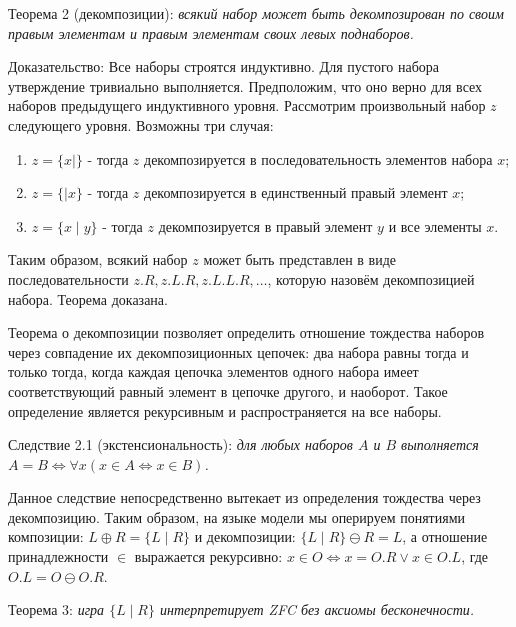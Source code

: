\documentclass[12pt]{article}
\begin{document}
Теорема 2 (декомпозиции): {\sl всякий набор может быть декомпозирован по своим правым элементам и правым элементам своих левых поднаборов.}

Доказательство:
Все наборы строятся индуктивно. Для пустого набора утверждение тривиально выполняется. Предположим, что оно верно для всех наборов предыдущего индуктивного уровня. Рассмотрим произвольный набор $z$ следующего уровня. Возможны три случая:
\begin{enumerate}
	\item $z = \{ x \mid \}$ - тогда $z$ декомпозируется в последовательность элементов набора $x$;
	\item $z = \{ \mid x \}$ - тогда $z$ декомпозируется в единственный правый элемент $x$;
	\item $z = \{ x \mid y \}$ - тогда $z$ декомпозируется в правый элемент $y$ и все элементы $x$.
\end{enumerate}
Таким образом, всякий набор $z$ может быть представлен в виде последовательности $z.R, z.L.R, z.L.L.R, \dots$, которую назовём декомпозицией набора. Теорема доказана.

Теорема о декомпозиции позволяет определить отношение тождества наборов через совпадение их декомпозиционных цепочек: два набора равны тогда и только тогда, когда каждая цепочка элементов одного набора имеет соответствующий равный элемент в цепочке другого, и наоборот. Такое определение является рекурсивным и распространяется на все наборы.

Следствие 2.1 (экстенсиональность): {\sl для любых наборов $A$ и $B$ выполняется $A = B \Leftrightarrow \forall x (x \in A \Leftrightarrow x \in B)$.}

Данное следствие непосредственно вытекает из определения тождества через декомпозицию. Таким образом, на языке модели мы оперируем понятиями композиции: $L \oplus R = \{ L \mid R \}$ и декомпозиции: $\{ L \mid R \} \ominus R = L$, а отношение принадлежности $\in$ выражается рекурсивно: $x \in O \Leftrightarrow x = O.R \vee x \in O.L$, где $O.L = O \ominus O.R$.

Теорема 3: {\sl игра $\{ L \mid R \}$ интерпретирует ZFC без аксиомы бесконечности.}
\end{document}
